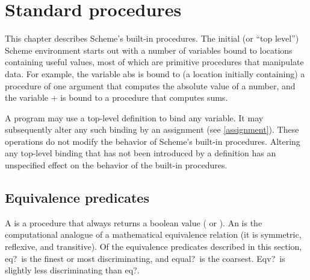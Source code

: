 
\chapter{Standard procedures}
\label{initialenv}
\label{builtinchapter}



This chapter describes Scheme's built-in procedures.  The initial (or
``top level'') Scheme environment starts out with a number of variables
bound to locations containing useful values, most of which are primitive
procedures that manipulate data.  For example, the variable {\cf abs} is
bound to (a location initially containing) a procedure of one argument
that computes the absolute value of a number, and the variable {\cf +}
is bound to a procedure that computes sums.  

A program may use a top-level definition to bind any variable.  It may
subsequently alter any such binding by an assignment (see \ref{assignment}).
These operations do not modify the behavior of Scheme's built-in
procedures.  Altering any top-level binding that has not been introduced by a
definition has an unspecified effect on the behavior of the built-in procedures.

\section{Equivalence predicates}
\label{equivalencesection}

A  is a procedure that always returns a boolean
value (\schtrue{} or \schfalse).  An  is
the computational analogue of a mathematical equivalence relation (it is
symmetric, reflexive, and transitive).  Of the equivalence predicates
described in this section, {\cf eq?}\ is the finest or most
discriminating, and {\cf equal?}\ is the coarsest.  {\cf Eqv?}\ is
slightly less discriminating than {\cf eq?}.  


